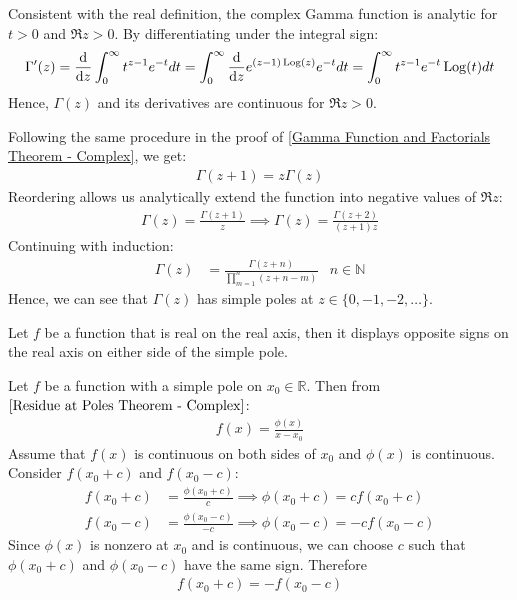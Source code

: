 \documentclass[12pt, english]{book}
\makeatletter
\DeclareMathOperator\Log{Log}
\renewenvironment{proof}[1][\proofname]{\par
	\pushQED{\qed}%
	\normalfont \topsep6\p@\@plus6\p@\relax
	\list{}{%
		\settowidth{\leftmargin}{\itshape\proofname:\hskip\labelsep}%
		\setlength{\labelwidth}{0pt}%
		\setlength{\itemindent}{-\leftmargin}%
		}%
	\item[\hskip\labelsep\itshape#1\@addpunct{:}]\ignorespaces
	}{\popQED\endlist\@endpefalse}
\makeatother
\begin{document}
	Consistent with the real definition, the complex Gamma function is analytic for \(t>0\) and \(\Re{z}>0\). By differentiating under the integral sign:
	\begin{align*}
		\Gamma '(z) = \dv{z} \int_{0}^{\infty} t^{z-1} e^{-t} dt  
			= \int_{0}^{\infty} \dv{z} e^{(z-1) \Log(z)} e^{-t} dt
			= \int_{0}^{\infty} t^{z-1} e^{-t} \Log(t) dt
	\end{align*}
	Hence, \(\Gamma(z)\) and its derivatives are continuous for \(\Re{z}>0\).
	
	Following the same procedure in the proof of \cref{Gamma Function and Factorials Theorem - Complex}, we get:
	\begin{align*}
		\Gamma(z+1) = z \Gamma(z)
	\end{align*}
	Reordering allows us analytically extend the function into negative values of \(\Re{z}\):
	\begin{align*}
		\Gamma(z) = \frac{\Gamma(z+1)}{z} \implies \Gamma(z) = \frac{\Gamma(z+2)}{(z+1)z}
	\end{align*}
	Continuing with induction:
	\begin{align*}
		\Gamma(z) &= \frac{\Gamma(z+n)}{\prod_{m=1}^{n} (z + n - m)}
			& n \in \mathbb{N}
	\end{align*}
	Hence, we can see that \(\Gamma(z)\) has simple poles at \(z \in \{0, -1, -2, \ldots\}\).
	
	\begin{theorem}
		\label{Function real on real axis implies alternating sign across simple pole on real axis theorem - Complex}
		Let \(f\) be a function that is real on the real axis, then it displays opposite signs on the real axis on either side of the simple pole.
	\end{theorem}
	\begin{proof}
		{\color{Grey}
		Let \(f\) be a function with a simple pole on \(x_0 \in \mathbb{R}\). Then from \(\cref{Residue at Poles Theorem - Complex}\):
		\begin{align*}
			f(x) = \frac{\phi(x)}{x-x_0}
		\end{align*}
		Assume that \(f(x)\) is continuous on both sides of \(x_0\) and \(\phi(x)\) is continuous. Consider \(f(x_0 + c)\) and \(f(x_0 - c)\):
		\begin{align*}
			f(x_0 + c) &= \frac{\phi(x_0 + c)}{c} \implies \phi(x_0 + c) = c f(x_0 + c)\\
			f(x_0 - c) &= \frac{\phi(x_0 - c)}{-c} \implies \phi(x_0 - c) = -c f(x_0 - c)
		\end{align*}
		Since \(\phi(x)\) is nonzero at \(x_0\) and is continuous, we can choose \(c\) such that \(\phi(x_0 + c)\) and \(\phi(x_0 - c)\) have the same sign. Therefore
		\begin{align*}
			f(x_0 + c) = - f(x_0 - c)
		\end{align*}
		}
	\end{proof}
	
\end{document}
